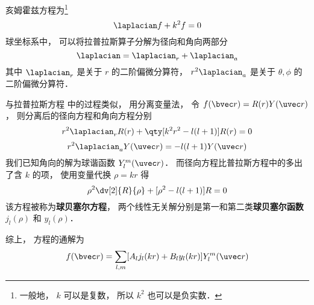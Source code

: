 

亥姆霍兹方程为\footnote{一般地， $k$ 可以是复数， 所以 $k^2$ 也可以是负实数．}
\begin{equation}
\laplacian f + k^2 f = 0
\end{equation}
球坐标系中， 可以将拉普拉斯算子分解为径向和角向两部分
\begin{equation}
\laplacian = \laplacian_r + \laplacian_{a}
\end{equation}
其中 $\laplacian_r$ 是关于 $r$ 的二阶偏微分算符， $r^2\laplacian_{a}$ 是关于 $\theta, \phi$ 的二阶偏微分算符．

与拉普拉斯方程 中的过程类似， 用分离变量法， 令 $f(\bvec r) = R(r) Y(\uvec r)$， 则分离后的径向方程和角向方程分别
\begin{equation}
r^2\laplacian_r R(r) + \qty[k^2 r^2 - l(l+1)] R(r) = 0
\end{equation}
\begin{equation}
r^2 \laplacian_{a} Y(\uvec r) = -l(l+1) Y(\uvec r)
\end{equation}
我们已知角向的解为球谐函数 $Y_l^m(\uvec r)$． 而径向方程比普拉斯方程中的多出了含 $k$ 的项， 使用变量代换 $\rho = kr$ 得
\begin{equation}
\rho^2\dv[2]{R}{\rho} + [\rho^2 - l(l+1)] R = 0
\end{equation}
该方程被称为\textbf{球贝塞尔方程}， 两个线性无关解分别是第一和第二类\textbf{球贝塞尔函数} $j_l(\rho)$ 和 $y_l(\rho)$．

综上， 方程的通解为
\begin{equation}
f(\bvec r) = \sum_{l,m} [A_l j_l(kr) + B_l y_l(kr)] Y_l^m(\uvec r)
\end{equation}
